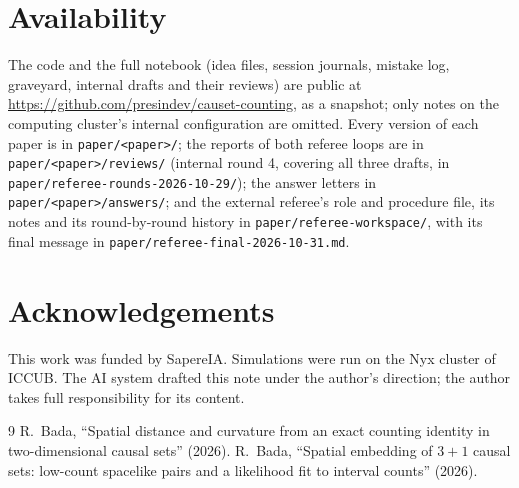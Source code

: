 \documentclass[11pt,a4paper]{article}
\begin{document}
\section*{Availability}
The code and the full notebook (idea files, session journals, mistake log, graveyard, internal drafts and their reviews) are public at \url{https://github.com/presindev/causet-counting}, as a snapshot; only notes on the computing cluster's internal configuration are omitted. Every version of each paper is in \nolinkurl{paper/<paper>/}; the reports of both referee loops are in \nolinkurl{paper/<paper>/reviews/} (internal round 4, covering all three drafts, in \nolinkurl{paper/referee-rounds-2026-10-29/}); the answer letters in \nolinkurl{paper/<paper>/answers/}; and the external referee's role and procedure file, its notes and its round-by-round history in \nolinkurl{paper/referee-workspace/}, with its final message in \nolinkurl{paper/referee-final-2026-10-31.md}.

\section*{Acknowledgements}
This work was funded by SapereIA. Simulations were run on the Nyx cluster of ICCUB. The AI system drafted this note under the author's direction; the author takes full responsibility for its content.

\begin{thebibliography}{9}\small
{} R.~Bada, ``Spatial distance and curvature from an exact counting identity in two-dimensional causal sets'' (2026).
 R.~Bada, ``Spatial embedding of $3+1$ causal sets: low-count spacelike pairs and a likelihood fit to interval counts'' (2026).
\end{thebibliography}
\end{document}
